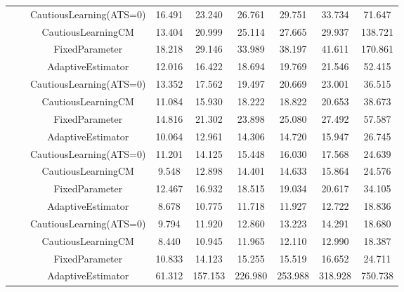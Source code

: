 \begin{table}[!h]
\begin{tabular}[t]{ccccccccc}
 &  & CautiousLearning(ATS=0) & 16.491 & 23.240 & 26.761 & 29.751 & 33.734 & 71.647\\

 &  & CautiousLearningCM & 13.404 & 20.999 & 25.114 & 27.665 & 29.937 & 138.721\\

 & \multirow[t]{-4}{*}{\centering\arraybackslash 0.75} & FixedParameter & 18.218 & 29.146 & 33.989 & 38.197 & 41.611 & 170.861\\
\cmidrule{2-9}
 &  & AdaptiveEstimator & 12.016 & 16.422 & 18.694 & 19.769 & 21.546 & 52.415\\

 &  & CautiousLearning(ATS=0) & 13.352 & 17.562 & 19.497 & 20.669 & 23.001 & 36.515\\

 &  & CautiousLearningCM & 11.084 & 15.930 & 18.222 & 18.822 & 20.653 & 38.673\\

 & \multirow[t]{-4}{*}{\centering\arraybackslash 1.00} & FixedParameter & 14.816 & 21.302 & 23.898 & 25.080 & 27.492 & 57.587\\
\cmidrule{2-9}
 &  & AdaptiveEstimator & 10.064 & 12.961 & 14.306 & 14.720 & 15.947 & 26.745\\

 &  & CautiousLearning(ATS=0) & 11.201 & 14.125 & 15.448 & 16.030 & 17.568 & 24.639\\

 &  & CautiousLearningCM & 9.548 & 12.898 & 14.401 & 14.633 & 15.864 & 24.576\\

 & \multirow[t]{-4}{*}{\centering\arraybackslash 1.25} & FixedParameter & 12.467 & 16.932 & 18.515 & 19.034 & 20.617 & 34.105\\
\cmidrule{2-9}
 &  & AdaptiveEstimator & 8.678 & 10.775 & 11.718 & 11.927 & 12.722 & 18.836\\

 &  & CautiousLearning(ATS=0) & 9.794 & 11.920 & 12.860 & 13.223 & 14.291 & 18.680\\

 &  & CautiousLearningCM & 8.440 & 10.945 & 11.965 & 12.110 & 12.990 & 18.387\\

\multirow[t]{-28}{*}{\centering\arraybackslash 1} & \multirow[t]{-4}{*}{\centering\arraybackslash 1.50} & FixedParameter & 10.833 & 14.123 & 15.255 & 15.519 & 16.652 & 24.711\\
\cmidrule{1-9}
 &  & AdaptiveEstimator & 61.312 & 157.153 & 226.980 & 253.988 & 318.928 & 750.738\\


\end{tabular}
\end{table}
